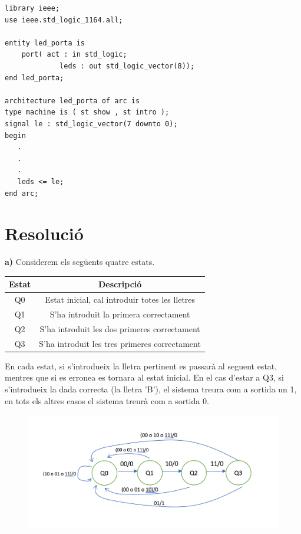 \documentclass[12pt, a4papre]{article}
\begin{document}
	\begin{lstlisting}[style=vhdl, frame=single, basicstyle=\small]
library ieee;
use ieee.std_logic_1164.all;

entity led_porta is
    port( act : in std_logic;  
             leds : out std_logic_vector(8));
end led_porta;

architecture led_porta of arc is
type machine is ( st show , st intro );
signal le : std_logic_vector(7 downto 0);
begin
   .
   .
   .
   leds <= le;
end arc;
	\end{lstlisting}
	
	\newpage
	
	\section{Resolució} 
	
	\textbf{a)} Considerem els següents quatre estats.
	
	\begin{table}[h!]
		\centering
		 \begin{tabular}{|c | c|} 
			 \hline
			 Estat & Descripció\\ [0.5ex] 
			 \hline\hline
			  Q0 &  Estat inicial, cal introduir totes les lletres\\ 
			  \hline
			  Q1 &  S'ha introduit la primera correctament\\ 
			 \hline
			 Q2 & S'ha introduit les dos primeres correctament\\ [0.5ex] 
			 \hline
			 Q3 & S'ha introduit les tres primeres correctament\\ 
			 \hline
		 \end{tabular}
	\end{table}
	
	En cada estat, si s'introdueix la lletra pertinent es passarà al seguent estat, mentres que si es erronea es tornara al estat inicial. En el cas d'estar a Q3, si s'introdueix la dada correcta (la lletra 'B'), el sistema treura com a sortida un 1, en tots els altres casos el sistema treurà com a sortida 0.
	
	\begin{figure}[H]
		\begin{center}
		\includegraphics[width=130mm]{ApartatA.png}
		\end{center}
	\end{figure}
	
\end{document}
